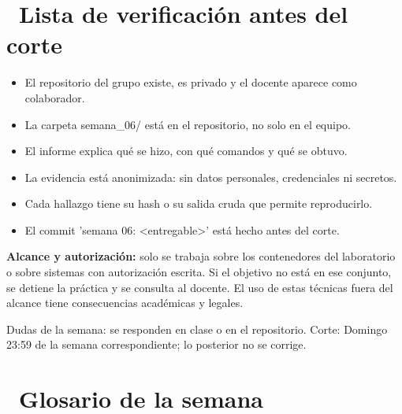 \documentclass[11pt,a4paper]{article}
\newcommand{\iconotexto}[2]{\textcolor{cyanNeon}{\faIcon{#1}}~#2}
\begin{document}
\section{\iconotexto{clipboard-check}{Lista de verificación antes del corte}}

\begin{itemize}[leftmargin=1.4em,itemsep=2pt,topsep=3pt]
  \item El repositorio del grupo existe, es privado y el docente aparece como colaborador.
  \item La carpeta semana\_06/ está en el repositorio, no solo en el equipo.
  \item El informe explica qué se hizo, con qué comandos y qué se obtuvo.
  \item La evidencia está anonimizada: sin datos personales, credenciales ni secretos.
  \item Cada hallazgo tiene su hash o su salida cruda que permite reproducirlo.
  \item El commit 'semana 06: \textless{}entregable\textgreater{}' está hecho antes del corte.
\end{itemize}

\begin{tcolorbox}[cajaMejora]\textbf{Alcance y autorización:} solo se trabaja sobre los contenedores del laboratorio o sobre sistemas con autorización escrita. Si el objetivo no está en ese conjunto, se detiene la práctica y se consulta al docente. El uso de estas técnicas fuera del alcance tiene consecuencias académicas y legales.
\end{tcolorbox}

\begin{cajaRecuerda}Dudas de la semana: se responden en clase o en el repositorio. Corte: Domingo 23:59 de la semana correspondiente; lo posterior no se corrige.
\end{cajaRecuerda}

\clearpage

\section{\iconotexto{book}{Glosario de la semana}}
\end{document}
